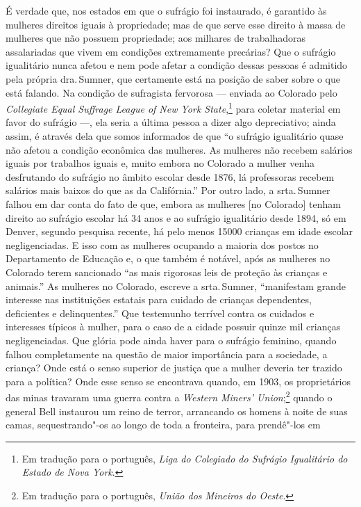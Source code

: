 É verdade que, nos estados em que o sufrágio foi instaurado, é garantido
às mulheres direitos iguais à propriedade; mas de que serve esse direito
à massa de mulheres que não possuem propriedade; aos milhares de
trabalhadoras assalariadas que vivem em condições extremamente
precárias? Que o sufrágio igualitário nunca afetou e nem pode afetar a
condição dessas pessoas é admitido pela própria dra.\,Sumner, que
certamente está na posição de saber sobre o que está falando. Na
condição de sufragista fervorosa --- enviada ao Colorado
pelo \textit{Collegiate Equal Suffrage League of New York State},\footnote{Em tradução para o português, \textit{Liga
do Colegiado do Sufrágio Igualitário do Estado de Nova York}.} para
coletar material em favor do sufrágio ---, ela seria a última pessoa a dizer
algo depreciativo; ainda assim, é através dela que somos informados
de que ``o sufrágio igualitário quase não afetou a condição econômica
das mulheres. As mulheres não recebem salários iguais por trabalhos
iguais e, muito embora no Colorado a mulher venha desfrutando do
sufrágio no âmbito escolar desde 1876, lá professoras recebem salários
mais baixos do que as da Califórnia.'' Por outro lado, a srta.\,Sumner falhou em dar conta do fato de que, embora as mulheres [no Colorado] tenham direito ao sufrágio escolar há 34 anos e ao sufrágio igualitário desde 1894, só em Denver, segundo pesquisa recente, há pelo menos 15000 crianças em idade escolar negligenciadas. E isso com as mulheres ocupando a maioria dos postos no Departamento de Educação e,
o que também é notável, após as mulheres no Colorado terem sancionado
``as mais rigorosas leis de proteção às crianças e animais.'' As
mulheres no Colorado, escreve a srta.\,Sumner, ``manifestam grande
interesse nas instituições estatais para cuidado de crianças
dependentes, deficientes e delinquentes.'' Que testemunho terrível
contra os cuidados e interesses típicos à mulher, para o caso de a cidade possuir
quinze mil crianças negligenciadas. Que glória pode ainda haver para o sufrágio
feminino, quando falhou completamente na questão de maior importância para a sociedade,
a criança? Onde está o senso superior de justiça que a mulher deveria
ter trazido para a política? Onde esse senso se encontrava quando, em
1903, os proprietários das minas travaram uma guerra contra a \textit{Western Miners' Union};\footnote{Em tradução para o português, \textit{União dos Mineiros do Oeste}.} quando o general
Bell instaurou um reino de terror, arrancando os homens à noite de suas
camas, sequestrando"-os ao longo de toda a fronteira, para prendê"-los em
